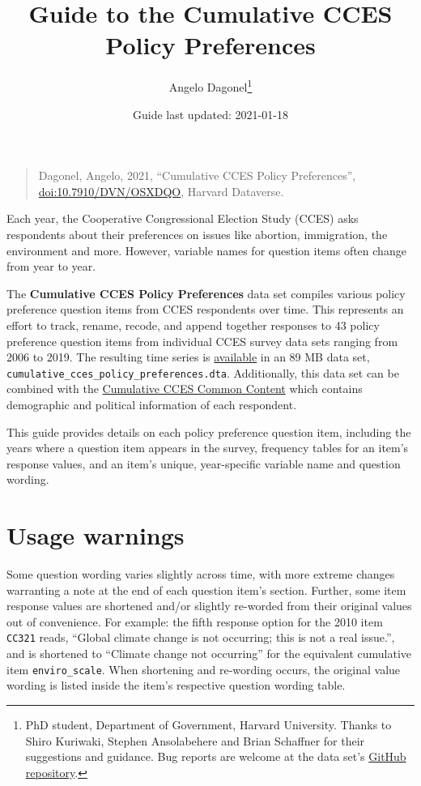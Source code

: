 \documentclass[12pt]{article}
\title{Guide to the Cumulative CCES Policy Preferences}
\author{Angelo Dagonel\footnote{PhD student, Department of Government, Harvard
  University. Thanks to Shiro Kuriwaki, Stephen Ansolabehere and Brian
  Schaffner for their suggestions and guidance. Bug reports are welcome
  at the data set's
  \href{https://github.com/psjello/cces_cumulative_preferences}{GitHub
  repository}.}}
\date{Guide last updated: 2021-01-18}
\begin{document}
\maketitle

\begin{quote}
Dagonel, Angelo, 2021, ``Cumulative CCES Policy Preferences'',
\href{https://dataverse.harvard.edu/dataset.xhtml?persistentId=doi:10.7910/DVN/OSXDQO}{\url{doi:10.7910/DVN/OSXDQO}},
Harvard Dataverse.
\end{quote}

Each year, the Cooperative Congressional Election Study (CCES) asks
respondents about their preferences on issues like abortion,
immigration, the environment and more. However, variable names for
question items often change from year to year.

\medskip
The \textbf{Cumulative CCES Policy Preferences} data set compiles
various policy preference question items from CCES respondents over
time. This represents an effort to track, rename, recode, and append
together responses to 43 policy preference question items from
individual CCES survey data sets ranging from 2006 to 2019. The
resulting time series is
\href{https://dataverse.harvard.edu/dataset.xhtml?persistentId=doi:10.7910/DVN/OSXDQO}{available}
in an 89 MB data set,
\texttt{cumulative\_cces\_policy\_preferences.dta}. Additionally, this
data set can be combined with the
\href{https://dataverse.harvard.edu/dataset.xhtml?persistentId=doi:10.7910/DVN/II2DB6}{Cumulative
CCES Common Content} which contains demographic and political
information of each respondent.

\medskip
This guide provides details on each policy preference question item,
including the years where a question item appears in the survey,
frequency tables for an item's response values, and an item's unique,
year-specific variable name and question wording.

\section{Usage warnings}\label{usage-warnings}

Some question wording varies slightly across time, with more extreme
changes warranting a note at the end of each question item's section.
Further, some item response values are shortened and/or slightly
re-worded from their original values out of convenience. For example:
the fifth response option for the 2010 item \texttt{CC321} reads,
``Global climate change is not occurring; this is not a real issue.'',
and is shortened to ``Climate change not occurring'' for the equivalent
cumulative item \texttt{enviro\_scale}. When shortening and re-wording
occurs, the original value wording is listed inside the item's
respective question wording table.
\end{document}
